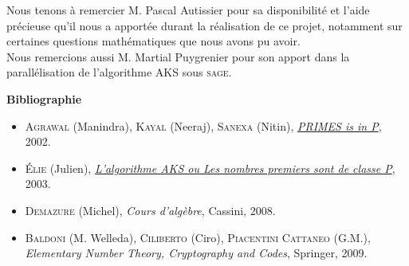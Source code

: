 \documentclass[11pt]{article}
\begin{document}
Nous tenons à remercier M. Pascal Autissier pour sa disponibilité et l'aide précieuse qu'il nous a apportée durant la réalisation de ce projet, notamment sur certaines questions mathématiques que nous avons pu avoir.\\

Nous remercions aussi M. Martial Puygrenier pour son apport dans la parallélisation de l'algorithme AKS sous \textsc{sage}.\\

\vspace{4cm}

\begin{center}
\begin{Large}
\textbf{Bibliographie}
\end{Large}
\end{center}

\begin{itemize}
\item \textsc{Agrawal} (Manindra), \textsc{Kayal} (Neeraj), \textsc{Sanexa} (Nitin), \href{http://annals.math.princeton.edu/wp-content/uploads/annals-v160-n2-p12.pdf}{\textit{PRIMES is in P}}, 2002.
\item \textsc{Élie} (Julien), \href{http://www.trigofacile.com/maths/curiosite/primarite/aks/pdf/algorithme-aks.pdf}{\textit{L'algorithme AKS ou Les nombres premiers sont de classe P}}, 2003.
\item \textsc{Demazure} (Michel), \textit{Cours d'algèbre}, Cassini, 2008.
\item \textsc{Baldoni} (M. Welleda), \textsc{Ciliberto} (Ciro), \textsc{Piacentini Cattaneo} (G.M.), \textit{Elementary Number Theory, Cryptography and Codes}, Springer, 2009.
\end{itemize}
\end{document}

